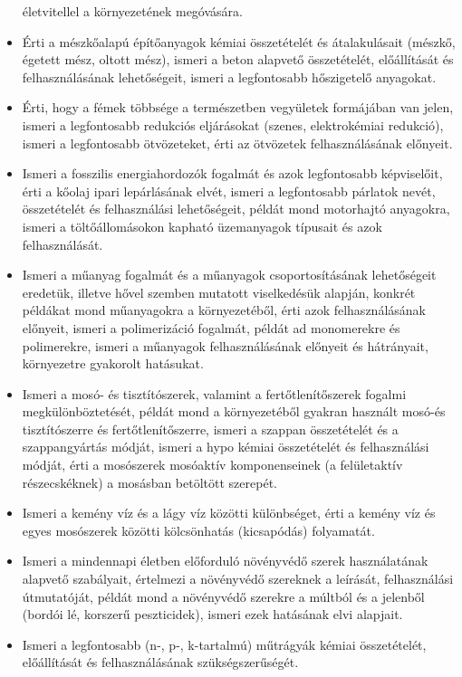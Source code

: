 \begin{itemize}
  életvitellel a környezetének megóvására.
\item
  Érti a mészkőalapú építőanyagok kémiai összetételét és átalakulásait
  (mészkő, égetett mész, oltott mész), ismeri a beton alapvető
  összetételét, előállítását és felhasználásának lehetőségeit, ismeri a
  legfontosabb hőszigetelő anyagokat.
\item
  Érti, hogy a fémek többsége a természetben vegyületek formájában van
  jelen, ismeri a legfontosabb redukciós eljárásokat (szenes,
  elektrokémiai redukció), ismeri a legfontosabb ötvözeteket, érti az
  ötvözetek felhasználásának előnyeit.
\item
  Ismeri a fosszilis energiahordozók fogalmát és azok legfontosabb
  képviselőit, érti a kőolaj ipari lepárlásának elvét, ismeri a
  legfontosabb párlatok nevét, összetételét és felhasználási
  lehetőségeit, példát mond motorhajtó anyagokra, ismeri a
  töltőállomásokon kapható üzemanyagok típusait és azok felhasználását.
\item
  Ismeri a műanyag fogalmát és a műanyagok csoportosításának
  lehetőségeit eredetük, illetve hővel szemben mutatott viselkedésük
  alapján, konkrét példákat mond műanyagokra a környezetéből, érti azok
  felhasználásának előnyeit, ismeri a polimerizáció fogalmát, példát ad
  monomerekre és polimerekre, ismeri a műanyagok felhasználásának
  előnyeit és hátrányait, környezetre gyakorolt hatásukat.
\item
  Ismeri a mosó- és tisztítószerek, valamint a fertőtlenítőszerek
  fogalmi megkülönböztetését, példát mond a környezetéből gyakran
  használt mosó-és tisztítószerre és fertőtlenítőszerre, ismeri a
  szappan összetételét és a szappangyártás módját, ismeri a hypo kémiai
  összetételét és felhasználási módját, érti a mosószerek mosóaktív
  komponenseinek (a felületaktív részecskéknek) a mosásban betöltött
  szerepét.
\item
  Ismeri a kemény víz és a lágy víz közötti különbséget, érti a kemény
  víz és egyes mosószerek közötti kölcsönhatás (kicsapódás) folyamatát.
\item
  Ismeri a mindennapi életben előforduló növényvédő szerek használatának
  alapvető szabályait, értelmezi a növényvédő szereknek a leírását,
  felhasználási útmutatóját, példát mond a növényvédő szerekre a múltból
  és a jelenből (bordói lé, korszerű peszticidek), ismeri ezek hatásának
  elvi alapjait.
\item
  Ismeri a legfontosabb (n-, p-, k-tartalmú) műtrágyák kémiai
  összetételét, előállítását és felhasználásának szükségszerűségét.

\end{itemize}
